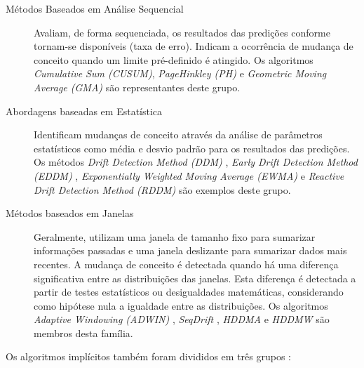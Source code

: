 \documentclass[qual, classic, a4paper]{ufbathesis}
\begin{document}
\begin{description}
    \item[Métodos Baseados em Análise Sequencial] Avaliam, de forma sequenciada, os resultados das predições conforme tornam-se disponíveis (taxa de erro).
    Indicam a ocorrência de mudança de conceito quando um limite pré-definido é atingido.
    Os algoritmos \textit{Cumulative Sum (CUSUM)}, \textit{PageHinkley (PH)} \cite{Page:CUSUM:PageHinkley:1954} e \textit{Geometric Moving Average (GMA)} \cite{Roberts:2000:CCT:338441.338464}
    são representantes deste grupo.

    \item[Abordagens baseadas em Estatística] Identificam mudanças de conceito através da análise de parâmetros estatísticos como média e desvio padrão para os resultados das predições.
    Os métodos \textit{Drift Detection Method (DDM)} \cite{GamaMCR04}, 
    \textit{Early Drift Detection Method (EDDM)} \cite{EDDM}, 
    \textit{Exponentially Weighted Moving Average (EWMA)} \cite{Ross:2012:EWM:2076039.2076307} e 
    \textit{Reactive Drift Detection Method (RDDM)} \cite{Barros:RDDM:2017} são exemplos deste grupo.

    \item[Métodos baseados em Janelas] Geralmente, utilizam uma janela de tamanho fixo para sumarizar informações passadas e uma janela deslizante para sumarizar dados mais recentes.
    A mudança de conceito é detectada quando há uma diferença significativa entre as distribuições das janelas.
    Esta diferença é detectada a partir de testes estatísticos ou desigualdades matemáticas, considerando como hipótese nula a igualdade entre as distribuições.
    Os algoritmos 
    \textit{Adaptive Windowing (ADWIN)} \cite{BifetG07}, 
    \textit{SeqDrift} \cite{PearsSK14:SeqDrift:2014}, 
    \textit{HDDMA} e \textit{HDDMW} \cite{BlancoCRBDM15:HDDMA:HDDMW:2015}
    são membros desta família.
\end{description}

Os algoritmos implícitos também foram divididos em três grupos \cite{GONCALVES20148144}:
\end{document}
